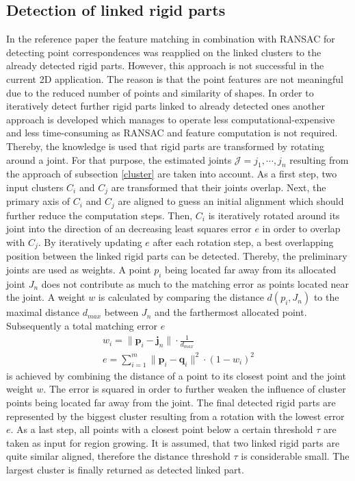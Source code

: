 \subsection{Detection of linked rigid parts}
\label{JointWeights}
In the reference paper the feature matching in combination with RANSAC for detecting point correspondences was reapplied on the linked clusters to the already detected rigid parts. However, this approach is not successful in the current 2D application. The reason is that the point features are not meaningful due to the reduced number of points and similarity of shapes. In order to iteratively detect further rigid parts linked to already detected ones another approach is developed which manages to operate less computational-expensive and less time-consuming as RANSAC and feature computation is not required. Thereby, the knowledge is used that rigid parts are transformed by rotating around a joint. For that purpose, the estimated joints $\mathcal{J} = j_1,\cdots,j_n$ resulting from the approach of subsection \ref{cluster} are taken into account. As a first step, two input clusters $C_i$ and $C_j$ are transformed that their joints overlap. Next, the primary axis of $C_i$ and $C_j$ are aligned to guess an initial alignment which should further reduce the computation steps. Then, $C_i$ is iteratively rotated around its joint into the direction of an decreasing least squares error $e$ in order to overlap with $C_j$. By iteratively updating $e$ after each rotation step, a best overlapping position between the linked rigid parts can be detected. Thereby, the preliminary joints are used as weights. A point $p_i$ being located far away from its allocated joint $J_n$ does not contribute as much to the matching error as points located near the joint. A weight $w$ is calculated by comparing the distance $d(p_i, J_n)$ to the maximal distance $d_{max}$ between $J_n$ and the farthermost allocated point. Subsequently a total matching error $e$
%
\begin{equation}
\begin{split}
w_i = \| \boldsymbol{p}_i - \boldsymbol{j}_n\| \cdot \frac{1}{d_{max}}
\\
e = \displaystyle\sum_{i=1}^{m}\| \boldsymbol{p}_i - \boldsymbol{q}_i\|^2 \cdot (1 - {w_i})^2
\end{split}
\label{eq:jointWeightError}
\end{equation}
%
is achieved by combining the distance of a point to its closest point and the joint weight $w$. The error is squared in order to further weaken the influence of cluster points being located far away from the joint. The final detected rigid parts are represented by the biggest cluster resulting from a rotation with the lowest error $e$. As a last step, all points with a closest point below a certain threshold $\tau$ are taken as input for region growing. It is assumed, that two linked rigid parts are quite similar aligned, therefore the distance threshold $\tau$ is considerable small. The largest cluster is finally returned as detected linked part.
